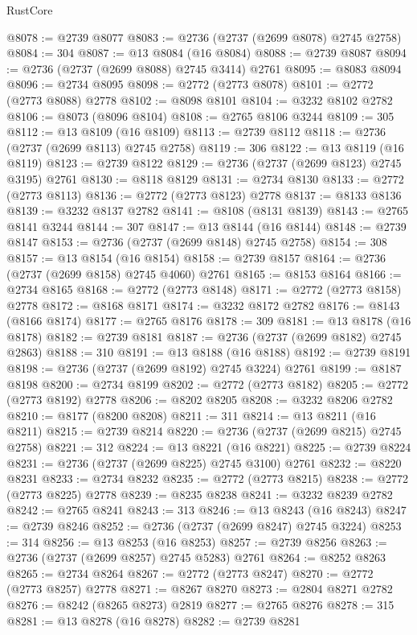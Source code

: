 \begin{lexlean}{RustCore}
\begin{coremodule}
@8078 := @2739 @8077
@8083 := @2736 (@2737 (@2699 @8078) @2745 @2758)
@8084 := 304
@8087 := @13 @8084 (@16 @8084)
@8088 := @2739 @8087
@8094 := @2736 (@2737 (@2699 @8088) @2745 @3414) @2761
@8095 := @8083 @8094
@8096 := @2734 @8095
@8098 := @2772 (@2773 @8078)
@8101 := @2772 (@2773 @8088) @2778
@8102 := @8098 @8101
@8104 := @3232 @8102 @2782
@8106 := @8073 (@8096 @8104)
@8108 := @2765 @8106 @3244
@8109 := 305
@8112 := @13 @8109 (@16 @8109)
@8113 := @2739 @8112
@8118 := @2736 (@2737 (@2699 @8113) @2745 @2758)
@8119 := 306
@8122 := @13 @8119 (@16 @8119)
@8123 := @2739 @8122
@8129 := @2736 (@2737 (@2699 @8123) @2745 @3195) @2761
@8130 := @8118 @8129
@8131 := @2734 @8130
@8133 := @2772 (@2773 @8113)
@8136 := @2772 (@2773 @8123) @2778
@8137 := @8133 @8136
@8139 := @3232 @8137 @2782
@8141 := @8108 (@8131 @8139)
@8143 := @2765 @8141 @3244
@8144 := 307
@8147 := @13 @8144 (@16 @8144)
@8148 := @2739 @8147
@8153 := @2736 (@2737 (@2699 @8148) @2745 @2758)
@8154 := 308
@8157 := @13 @8154 (@16 @8154)
@8158 := @2739 @8157
@8164 := @2736 (@2737 (@2699 @8158) @2745 @4060) @2761
@8165 := @8153 @8164
@8166 := @2734 @8165
@8168 := @2772 (@2773 @8148)
@8171 := @2772 (@2773 @8158) @2778
@8172 := @8168 @8171
@8174 := @3232 @8172 @2782
@8176 := @8143 (@8166 @8174)
@8177 := @2765 @8176
@8178 := 309
@8181 := @13 @8178 (@16 @8178)
@8182 := @2739 @8181
@8187 := @2736 (@2737 (@2699 @8182) @2745 @2863)
@8188 := 310
@8191 := @13 @8188 (@16 @8188)
@8192 := @2739 @8191
@8198 := @2736 (@2737 (@2699 @8192) @2745 @3224) @2761
@8199 := @8187 @8198
@8200 := @2734 @8199
@8202 := @2772 (@2773 @8182)
@8205 := @2772 (@2773 @8192) @2778
@8206 := @8202 @8205
@8208 := @3232 @8206 @2782
@8210 := @8177 (@8200 @8208)
@8211 := 311
@8214 := @13 @8211 (@16 @8211)
@8215 := @2739 @8214
@8220 := @2736 (@2737 (@2699 @8215) @2745 @2758)
@8221 := 312
@8224 := @13 @8221 (@16 @8221)
@8225 := @2739 @8224
@8231 := @2736 (@2737 (@2699 @8225) @2745 @3100) @2761
@8232 := @8220 @8231
@8233 := @2734 @8232
@8235 := @2772 (@2773 @8215)
@8238 := @2772 (@2773 @8225) @2778
@8239 := @8235 @8238
@8241 := @3232 @8239 @2782
@8242 := @2765 @8241
@8243 := 313
@8246 := @13 @8243 (@16 @8243)
@8247 := @2739 @8246
@8252 := @2736 (@2737 (@2699 @8247) @2745 @3224)
@8253 := 314
@8256 := @13 @8253 (@16 @8253)
@8257 := @2739 @8256
@8263 := @2736 (@2737 (@2699 @8257) @2745 @5283) @2761
@8264 := @8252 @8263
@8265 := @2734 @8264
@8267 := @2772 (@2773 @8247)
@8270 := @2772 (@2773 @8257) @2778
@8271 := @8267 @8270
@8273 := @2804 @8271 @2782
@8276 := @8242 (@8265 @8273) @2819
@8277 := @2765 @8276
@8278 := 315
@8281 := @13 @8278 (@16 @8278)
@8282 := @2739 @8281

\end{coremodule}
\end{lexlean}
